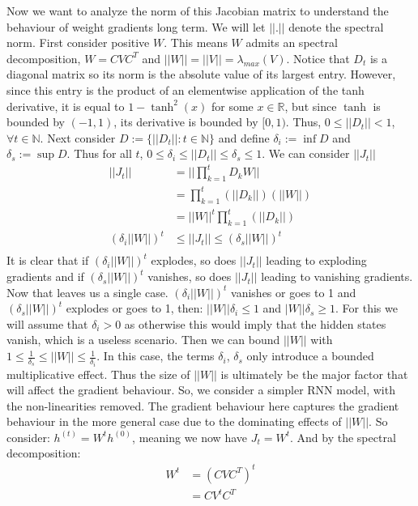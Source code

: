 \documentclass[12pt]{article}
\begin{document}
Now we want to analyze the norm of this Jacobian matrix to understand the behaviour of weight gradients long term. We will let $||.||$ denote the spectral norm.
First consider positive $W$. This means $W$ admits an spectral decomposition, $W = CVC^T$ and $||W|| = ||V|| = \lambda_{max}(V)$.
Notice that $D_t$ is a diagonal matrix so its norm is the absolute value of its largest entry. However, since this entry is the product of an elementwise application of
the tanh derivative, it is equal to $1 - \tanh^2(x)$ for some $x \in \mathbb{R}$, but since $\tanh$ is bounded by $(-1, 1)$, its derivative is bounded
by $[0, 1)$. Thus, $0 \leq ||D_t|| < 1$, $\forall t \in \mathbb{N}$. Next consider $D := \{||D_t||: t \in \mathbb{N}\}$ and define $\delta_i := \inf D$ and $\delta_s := \sup D$.
Thus for all $t$, $0 \leq \delta_i \leq ||D_t|| \leq \delta_s \leq 1$. We can consider $||J_t||$
\begin{align*}
    ||J_t|| &= ||\prod_{k = 1}^{t}D_kW|| \\
    &= \prod_{k=1}^{t}(||D_k||)(||W||) \\
    &= ||W||^t\prod_{k=1}^{t}(||D_k||) \\
    (\delta_i||W||)^t &\leq ||J_t|| \leq (\delta_s||W||)^t \\
\end{align*}
It is clear that if $(\delta_i||W||)^t$ explodes, so does $||J_t||$ leading to exploding gradients and if $(\delta_s||W||)^t$ vanishes, so does
$||J_t||$ leading to vanishing gradients. Now that leaves us a single case. $(\delta_i||W||)^t$ vanishes or goes to 1 and $(\delta_s||W||)^t$ explodes or goes to 1,
then: $||W||\delta_i \leq 1$ and $|W||\delta_s \geq 1$. For this we will assume that $\delta_i > 0$ as otherwise this would imply that the hidden states vanish, which is
a useless scenario. Then we can bound $||W||$ with $1 \leq \frac{1}{\delta_s} \leq ||W|| \leq \frac{1}{\delta_i}$. In this case, the terms $\delta_i$, $\delta_s$ only introduce a bounded
multiplicative effect. Thus the size of $||W||$ is ultimately be the major factor that will affect the gradient behaviour. So, we consider a simpler RNN model,
with the non-linearities removed. The gradient behaviour here captures the gradient behaviour in the more general case due to the dominating effects of $||W||$.
So consider: $h^{(t)} = W^th^{(0)}$, meaning we now have $J_t = W^t$. And by the spectral decomposition:
\begin{align*}
    W^t &= (CVC^T)^t \\
    &= CV^tC^T
\end{align*}
\end{document}
